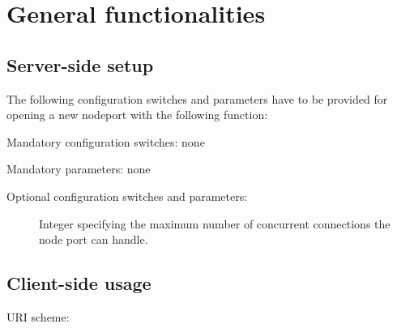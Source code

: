 \section{General functionalities}


\subsection{Server-side setup}

The following configuration switches and parameters have to be provided for opening a new nodeport with the following function:


Mandatory configuration switches: none

Mandatory parameters: none

Optional configuration switches and parameters:
\begin{description}
  \item[]
Integer specifying the maximum number of concurrent connections the node port can handle.
\end{description}


\subsection{Client-side usage}

URI scheme: 
